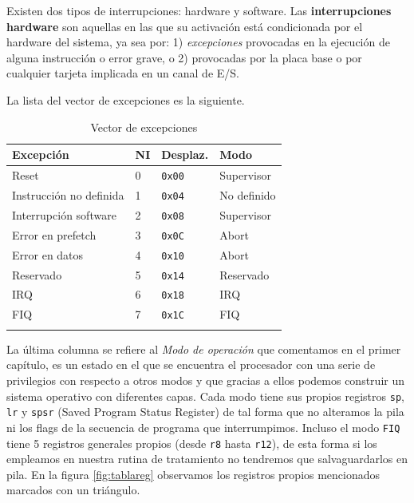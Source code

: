 Existen dos tipos de interrupciones: hardware y software. Las {\bf
interrupciones hardware} son aquellas en las que su activación está
condicionada por el hardware del sistema, ya sea por: 1) {\it
excepciones} provocadas en la ejecución de alguna instrucción o error
grave, o 2) provocadas por la placa base o por cualquier tarjeta
implicada en un canal de E/S.

\noindent La lista del vector de excepciones es la siguiente.

\begin{longtable}{ p{5cm} | p{1cm} | p{2cm} | p{4cm}}
\hline
{\bf Excepción} & {\bf NI} & {\bf Desplaz.} & {\bf Modo} \\ \hline
Reset                   & 0 & {\tt 0x00} & Supervisor \\ \hline
Instrucción no definida & 1 & {\tt 0x04} & No definido \\ \hline
Interrupción software   & 2 & {\tt 0x08} & Supervisor \\ \hline
Error en prefetch       & 3 & {\tt 0x0C} & Abort \\ \hline
Error en datos          & 4 & {\tt 0x10} & Abort \\ \hline
Reservado               & 5 & {\tt 0x14} & Reservado \\ \hline
IRQ                     & 6 & {\tt 0x18} & IRQ \\ \hline
FIQ                     & 7 & {\tt 0x1C} & FIQ \\ \hline
\caption{Vector de excepciones}
\label{tab:excepciones}
\end{longtable}

La última columna se refiere al {\it Modo de operación} que comentamos en el primer
capítulo, es un estado en el que se encuentra el procesador con una serie de privilegios
con respecto a otros modos y que gracias a ellos podemos construir un sistema operativo
con diferentes capas. Cada modo tiene sus propios registros {\tt sp}, {\tt lr} y {\tt spsr}
(Saved Program Status Register) de tal
forma que no alteramos la pila ni los flags de la secuencia de programa que interrumpimos. Incluso
el modo {\tt FIQ} tiene 5 registros generales propios (desde {\tt r8} hasta {\tt r12}),
de esta forma si los empleamos en nuestra rutina de tratamiento no tendremos que
salvaguardarlos en pila. En la figura \ref{fig:tablareg} observamos los registros propios
mencionados marcados con un triángulo.

